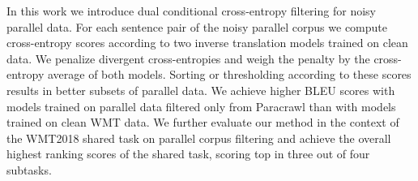In this work we introduce dual conditional cross-entropy filtering for noisy parallel data. For each sentence pair of the noisy parallel corpus we compute cross-entropy scores according to two inverse translation models trained on clean data. We penalize divergent cross-entropies and weigh the penalty by the cross-entropy average of both models. Sorting or thresholding according to these scores results in better subsets of parallel data. We achieve higher BLEU scores with models trained on parallel data filtered only from Paracrawl than with models trained on clean WMT data. We further evaluate our method in the context of the WMT2018 shared task on parallel corpus filtering and achieve the overall highest ranking scores of the shared task, scoring top in three out of four subtasks.
